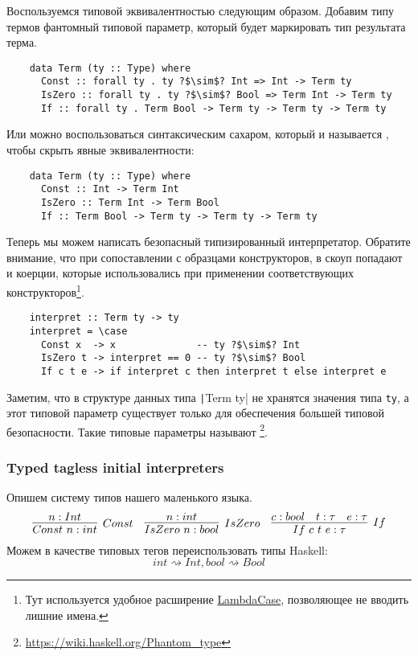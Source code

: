 Воспользуемся типовой эквивалентностью следующим образом.
Добавим типу термов фантомный типовой параметр, который будет маркировать тип результата терма.
\begin{verbatim}
    data Term (ty :: Type) where
      Const :: forall ty . ty ?$\sim$? Int => Int -> Term ty
      IsZero :: forall ty . ty ?$\sim$? Bool => Term Int -> Term ty
      If :: forall ty . Term Bool -> Term ty -> Term ty -> Term ty
\end{verbatim}
Или можно воспользоваться синтаксическим сахаром, который и называется , чтобы скрыть явные эквивалентности:
\begin{verbatim}
    data Term (ty :: Type) where
      Const :: Int -> Term Int
      IsZero :: Term Int -> Term Bool
      If :: Term Bool -> Term ty -> Term ty -> Term ty
\end{verbatim}

Теперь мы можем написать безопасный типизированный интерпретатор.
Обратите внимание, что при сопоставлении с образцами конструкторов, в скоуп попадают и коерции, которые использовались при применении соответствующих конструкторов\footnote{Тут используется удобное расширение \href{https://downloads.haskell.org/~ghc/9.0.1/docs/html/users_guide/exts/lambda_case.html}{LambdaCase}, позволяющее не вводить лишние имена.}.
\begin{verbatim}
    interpret :: Term ty -> ty
    interpret = \case
      Const x  -> x              -- ty ?$\sim$? Int
      IsZero t -> interpret == 0 -- ty ?$\sim$? Bool
      If c t e -> if interpret c then interpret t else interpret e
\end{verbatim}

Заметим, что в структуре данных типа \texttt|Term ty| не хранятся значения типа \texttt{ty}, а этот типовой параметр существует только для обеспечения большей типовой безопасности.
Такие типовые параметры называют \footnote{\url{https://wiki.haskell.org/Phantom_type}}.

\subsubsection{Typed tagless initial interpreters}

Опишем систему типов нашего маленького языка.
\begin{equation*}{}
    \infer[Const]{Const~n : int}{n : Int}
    \quad
    \infer[IsZero]{IsZero~n : bool}{n : int}
    \quad
    \infer[If]{If~c~t~e : \tau}{c : bool & t : \tau & e : \tau}
\end{equation*}
Можем в качестве типовых тегов переиспользовать типы Haskell: \[int \rightsquigarrow Int, bool \rightsquigarrow Bool\]

